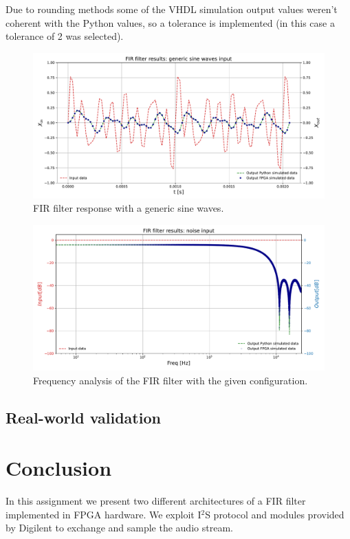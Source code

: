 \documentclass[11pt, a4paper]{article}
\begin{document}
Due to rounding methods some of the VHDL simulation output values weren't coherent with the Python values, so a tolerance is implemented (in this case a tolerance of 2 was selected).

\begin{figure}[!h]
    \centering
    \includegraphics[width=1.0\textwidth]{images/FIR_out.pdf}
    \caption{FIR filter response with a generic sine waves.}
    \label{fig:FIR_response}
\end{figure}

\begin{figure}[!h]
    \centering
    \includegraphics[width=1.0\textwidth]{images/fft_plot_log.pdf}
    \caption{Frequency analysis of the FIR filter with the given configuration.}
    \label{fig:FIR_freq_analysis}
\end{figure}

\subsection{Real-world validation}



\section{Conclusion}
In this assignment we present two different architectures of a FIR filter implemented in FPGA hardware. We exploit I$^2$S protocol and modules provided by Digilent to exchange and sample the audio stream.
\end{document}
